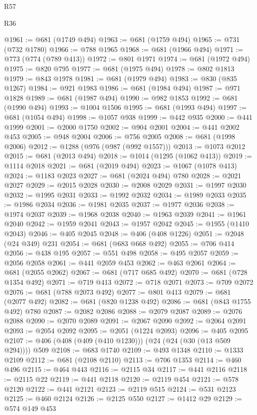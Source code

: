 \begin{lexlean}{R57}
\begin{lexlean}{R36}
\begin{coremodule}
{{{{{{{{{{{{{{{{{{{{{{{{{{{{{{{{{{{{{{{{{{{{{{{{{{{{{{{{{{{{{{{{{{{{{{{{{{{{{{{{{{@1961 := @681 (@1749 @494)
@1963 := @681 (@1759 @494)
@1965 := @731 (@732 @1780)
@1966 := @788 @1965
@1968 := @681 (@1966 @494)
@1971 := @773 (@774 (@789 @413))
@1972 := @801 @1971
@1974 := @681 (@1972 @494)
@1975 := @820 @795
@1977 := @681 (@1975 @494)
@1978 := @802 @1813
@1979 := @843 @1978
@1981 := @681 (@1979 @494)
@1983 := @830 (@835 @1267)
@1984 := @921 @1983
@1986 := @681 (@1984 @494)
@1987 := @971 @1828
@1989 := @681 (@1987 @494)
@1990 := @982 @1853
@1992 := @681 (@1990 @494)
@1993 := @1004 @1506
@1995 := @681 (@1993 @494)
@1997 := @681 (@1054 @494)
@1998 := @1057 @938
@1999 := @442 @935
@2000 := @441 @1999
@2001 := @2000 @1750
@2002 := @904 @2001
@2004 := @441 @2002 @453
@2005 := @948 @2004
@2006 := @756 @2005
@2008 := @681 (@1998 @2006)
@2012 := @1288 (@976 (@987 (@992 @1557)))
@2013 := @1073 @2012
@2015 := @681 (@2013 @494)
@2018 := @1014 (@1295 (@1062 @413))
@2019 := @1114 @2018
@2021 := @681 (@2019 @494)
@2023 := @1067 (@1078 @413)
@2024 := @1183 @2023
@2027 := @681 (@2024 @494) @780
@2028 := @2021 @2027
@2029 := @2015 @2028
@2030 := @2008 @2029
@2031 := @1997 @2030
@2032 := @1995 @2031
@2033 := @1992 @2032
@2034 := @1989 @2033
@2035 := @1986 @2034
@2036 := @1981 @2035
@2037 := @1977 @2036
@2038 := @1974 @2037
@2039 := @1968 @2038
@2040 := @1963 @2039
@2041 := @1961 @2040
@2042 := @1959 @2041
@2043 := @1957 @2042
@2045 := @1955 (@1410 @2043)
@2046 := @405 @2045
@2048 := @406 (@408 @1226)
@2051 := @2048 (@24 @349) @231
@2054 := @681 (@683 @668 @492)
@2055 := @706 @414
@2056 := @438 @195
@2057 := @551 @498
@2058 := @495 @2057
@2059 := @2056 @2058
@2061 := @441 @2059 @453
@2062 := @463 @2061
@2064 := @681 (@2055 @2062)
@2067 := @681 (@717 @685 @492)
@2070 := @681 (@728 @1354 @492)
@2071 := @719 @413
@2072 := @718 @2071
@2073 := @709 @2072
@2076 := @681 (@788 @2073 @492)
@2077 := @801 @413
@2079 := @681 (@2077 @492)
@2082 := @681 (@820 @1238 @492)
@2086 := @681 (@843 @1755 @492) @780
@2087 := @2082 @2086
@2088 := @2079 @2087
@2089 := @2076 @2088
@2090 := @2070 @2089
@2091 := @2067 @2090
@2092 := @2064 @2091
@2093 := @2054 @2092
@2095 := @2051 (@1224 @2093)
@2096 := @405 @2095
@2107 := @406 (@408 (@409 (@410 @1230))) (@24 (@24 (@30 (@13 @509 @294)))) @509
@2108 := @683 @1740
@2109 := @493 @1348
@2110 := @1333 @2109
@2112 := @681 (@2108 @2110)
@2113 := @706 @1353
@2114 := @460 @496
@2115 := @464 @443
@2116 := @2115 @34
@2117 := @441 @2116
@2118 := @2115 @22
@2119 := @441 @2118
@2120 := @2119 @454
@2121 := @578 @2120
@2122 := @441 @2121
@2123 := @2119 @515
@2124 := @531 @2123
@2125 := @460 @2124
@2126 := @2125 @550
@2127 := @1412 @29
@2129 := @574 @149 @453
}}}}}}}}}}}}}}}}}}}}}}}}}}}}}}}}}}}}}}}}}}}}}}}}}}}}}}}}}}}}}}}}}}}}}}}}}}}}}}}}}}
\end{coremodule}
\end{lexlean}
\end{lexlean}
